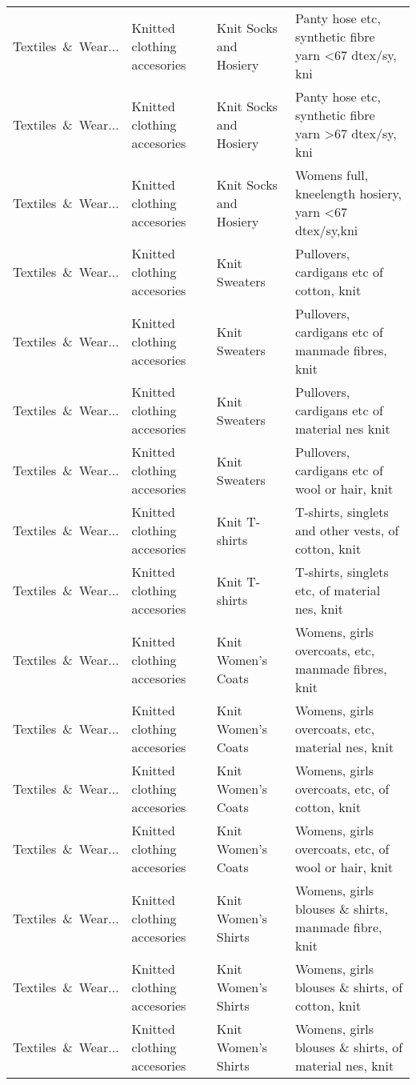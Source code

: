 \begin{appendices}
\begin{xltabular}{\textwidth}{|p{0.10\textwidth}|p{0.25\textwidth}|p{0.24\textwidth}|p{0.31\textwidth}|}
Textiles\ \&\ Wear... & Knitted clothing accesories & Knit Socks and Hosiery & Panty hose etc, synthetic fibre yarn <67 dtex/sy, kni \\
Textiles\ \&\ Wear... & Knitted clothing accesories & Knit Socks and Hosiery & Panty hose etc, synthetic fibre yarn >67 dtex/sy, kni \\
Textiles\ \&\ Wear... & Knitted clothing accesories & Knit Socks and Hosiery & Womens full, kneelength hosiery, yarn <67 dtex/sy,kni \\
Textiles\ \&\ Wear... & Knitted clothing accesories & Knit Sweaters & Pullovers, cardigans etc of cotton, knit \\
Textiles\ \&\ Wear... & Knitted clothing accesories & Knit Sweaters & Pullovers, cardigans etc of manmade fibres, knit \\
Textiles\ \&\ Wear... & Knitted clothing accesories & Knit Sweaters & Pullovers, cardigans etc of material nes knit \\
Textiles\ \&\ Wear... & Knitted clothing accesories & Knit Sweaters & Pullovers, cardigans etc of wool or hair, knit \\
Textiles\ \&\ Wear... & Knitted clothing accesories & Knit T-shirts & T-shirts, singlets and other vests, of cotton, knit \\
Textiles\ \&\ Wear... & Knitted clothing accesories & Knit T-shirts & T-shirts, singlets etc, of material nes, knit \\
Textiles\ \&\ Wear... & Knitted clothing accesories & Knit Women's Coats & Womens, girls overcoats, etc, manmade fibres, knit \\
Textiles\ \&\ Wear... & Knitted clothing accesories & Knit Women's Coats & Womens, girls overcoats, etc, material nes, knit \\
Textiles\ \&\ Wear... & Knitted clothing accesories & Knit Women's Coats & Womens, girls overcoats, etc, of cotton, knit \\
Textiles\ \&\ Wear... & Knitted clothing accesories & Knit Women's Coats & Womens, girls overcoats, etc, of wool or hair, knit \\
Textiles\ \&\ Wear... & Knitted clothing accesories & Knit Women's Shirts & Womens, girls blouses \& shirts, manmade fibre, knit \\
Textiles\ \&\ Wear... & Knitted clothing accesories & Knit Women's Shirts & Womens, girls blouses \& shirts, of cotton, knit \\
Textiles\ \&\ Wear... & Knitted clothing accesories & Knit Women's Shirts & Womens, girls blouses \& shirts, of material nes, knit \\

\end{xltabular}
\end{appendices}
